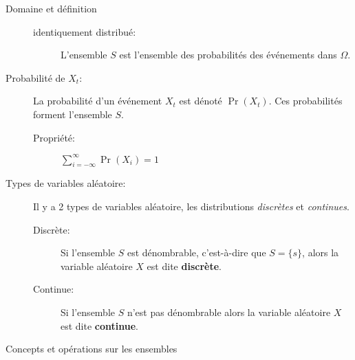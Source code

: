 \documentclass[10pt, french]{article}
\begin{document}
\begin{multicols*}{3}
\begin{rappel}{Domaine et définition}
\begin{description}
\begin{description}
		\item[identiquement distribué: ] L'ensemble $S$ est l'ensemble des probabilités des événements dans $\Omega$.
	\end{description}
	\item[Probabilité de $X_{t}$: ]	La probabilité d'un événement $X_{t}$ est dénoté $\Pr(X_{t})$. 
	Ces probabilités forment l'ensemble $S$.
	\begin{description}
		\item[Propriété: ] $\sum_{i = -\infty}^{\infty} \Pr(X_{i}) = 1$
	\end{description}
	\item[Types de variables aléatoire: ]	Il y a 2 types de variables aléatoire, les distributions \textit{discrètes} et \textit{continues}.
		\begin{description}
		\item[Discrète: ]	Si l'ensemble $S$ est dénombrable, c'est-à-dire que $S= \{s\}$, alors la variable aléatoire $X$ est dite \textbf{discrète}.
		\item[Continue: ]	Si l'ensemble $S$ n'est pas dénombrable alors la variable aléatoire $X$ est dite \textbf{continue}.
	\end{description}
\end{description}
\end{rappel}

\begin{probch2}{Concepts et opérations sur les ensembles}
\begin{description} 



\end{description}
\end{probch2}
\end{multicols*}
\end{document}
